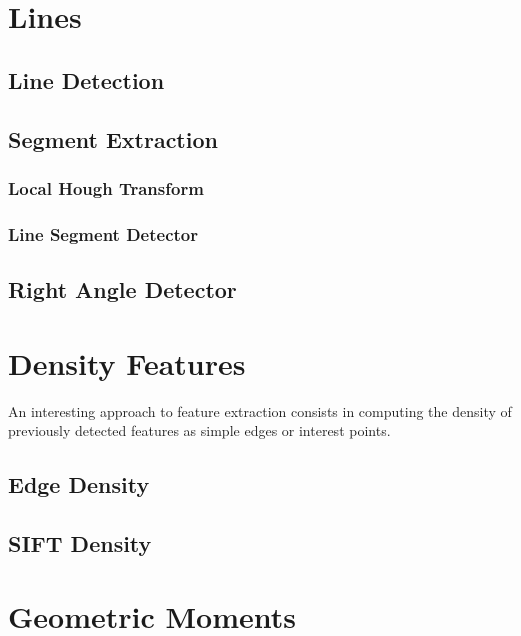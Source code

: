 \section{Lines}
\label{sec:LineDetectors}

\subsection{Line Detection}
\label{sec:LineDetection}






\subsection{Segment Extraction}
\label{sec:SegmentExtraction}
\subsubsection{Local Hough Transform}

%
%
\subsubsection{Line Segment Detector}
\label{sec:LSD}

\subsection{Right Angle Detector}
\label{sec:RightAngleDetector}



\section{Density Features}
An interesting approach to feature extraction consists in computing
the density of previously detected features as simple edges or
interest points.
\subsection{Edge Density}

\subsection{SIFT Density}


\section{Geometric Moments}

